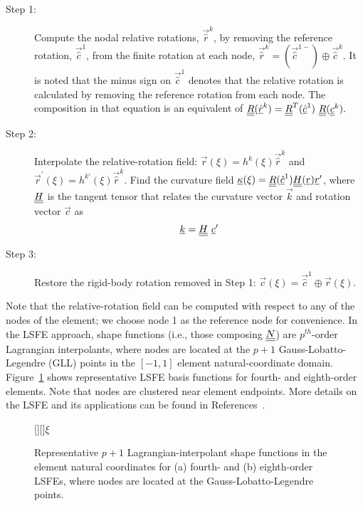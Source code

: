 \begin{description}

    \item[Step 1:] Compute the nodal relative rotations, $\vec{\hat{r}}^k$,
by removing the reference rotation, $\vec{\hat{c}}^1$, from the finite
rotation at each node, $\vec{\hat{r}}^k = (\vec{\hat{c}}^{1-}) \oplus
\vec{\hat{c}}^k$. It is noted that the minus sign on $\vec{\hat{c}}^1$ denotes that the relative rotation is calculated by removing the reference rotation from each node.  The composition in that equation is an equivalent of $\underline{\underline{R}}(\underline{\hat{r}}^k) = \underline{\underline{R}}^T(\underline{\hat{c}}^1)~\underline{\underline{R}}(\underline{\underline{c}}^k).$

    \item[Step 2:] Interpolate the relative-rotation field: $\vec{r}(\xi) = h^k(\xi) \vec{\hat{r}}^k$ and $\vec{r}^\prime(\xi) = h^{k \prime}(\xi) \vec{\hat{r}}^k$. Find the curvature field $\underline{\kappa}(\xi) = \underline{\underline{R}}(\underline{\hat{c}}^1) \underline{\underline{H}}(\underline{r}) \underline{r}^\prime$, where $\underline{\underline{H}}$ is the tangent tensor that relates the curvature vector $\vec{k}$ and rotation vector $\vec{c}$ as
\begin{equation}
    \label{Tensor}
    \underline{k} = \underline{\underline{H}}~ \underline{c}^\prime
\end{equation}

    \item[Step 3:] Restore the rigid-body rotation removed in Step 1: $\vec{c}(\xi) = \vec{\hat{c}}^1 \oplus \vec{r}(\xi)$.
\end{description} 


Note that the relative-rotation field can be computed with respect to any of the nodes of the element; we choose node 1 as the reference node for convenience. 
In the LSFE approach, shape functions (i.e., those composing $\underline{\underline{N}}$) are $p^{th}$-order Lagrangian interpolants, where nodes are located at the $p+1$ Gauss-Lobatto-Legendre (GLL) points in the $[-1,1]$ element natural-coordinate domain.  
Figure~\ref{fig:N4_lsfe} shows representative LSFE basis functions for  fourth- and eighth-order elements. 
Note that nodes are clustered near element endpoints. More details on the LSFE and its applications can be found in References~\cite{Patera:1984,Ronquist:1987,Sprague:2003,Sprague:2004}.

\begin{figure}[h]
    \centering
    [][]{$\xi$}
    \caption{Representative $p+1$ Lagrangian-interpolant shape functions in the element natural coordinates for (a) fourth- and (b) eighth-order LSFEs, where nodes are located at the Gauss-Lobatto-Legendre points.}
    \label{fig:N4_lsfe}
\end{figure}

